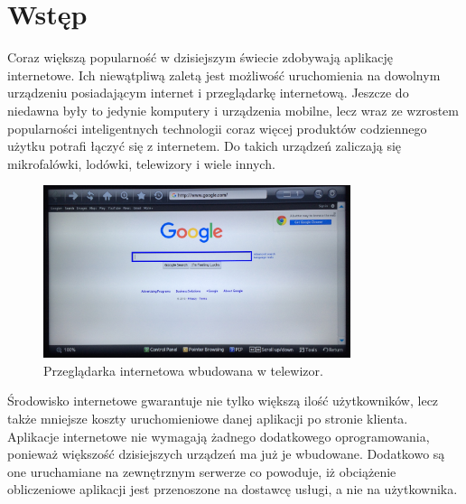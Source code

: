 {\let\cleardoublepage\relax \chapter{Wstęp}}
\label{cha:wstep}





Coraz większą popularność w dzisiejszym świecie zdobywają aplikację internetowe. Ich niewątpliwą zaletą jest możliwość uruchomienia na dowolnym urządzeniu posiadającym internet i przeglądarkę internetową. Jeszcze do niedawna były to jedynie komputery i urządzenia mobilne, lecz wraz ze wzrostem popularności inteligentnych technologii coraz więcej produktów codziennego użytku potrafi łączyć się z internetem. Do takich urządzeń zaliczają się mikrofalówki, lodówki, telewizory i wiele innych.

\begin{figure}[h]
	\centering
	\includegraphics[height=50.5mm]{images/Browser.jpg}
	 \caption{Przeglądarka internetowa wbudowana w telewizor.}
\end{figure}


Środowisko internetowe gwarantuje nie tylko większą ilość użytkowników, lecz także mniejsze koszty uruchomieniowe danej aplikacji po stronie klienta. Aplikacje internetowe nie wymagają żadnego dodatkowego oprogramowania, ponieważ większość dzisiejszych urządzeń ma już je wbudowane. Dodatkowo są one uruchamiane na zewnętrznym serwerze co powoduje, iż obciążenie obliczeniowe aplikacji jest przenoszone na dostawcę usługi, a nie na użytkownika. 

